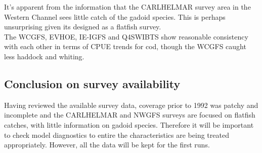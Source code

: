 \documentclass[12pt]{article}\usepackage[]{graphicx}\usepackage[]{color}
\makeatletter
\newcommand{\hlnum}[1]{\textcolor[rgb]{0.686,0.059,0.569}{#1}}%
\newcommand{\hlstr}[1]{\textcolor[rgb]{0.192,0.494,0.8}{#1}}%
\newcommand{\hlopt}[1]{\textcolor[rgb]{0,0,0}{#1}}%
\newcommand{\hlstd}[1]{\textcolor[rgb]{0.345,0.345,0.345}{#1}}%
\newcommand{\hlkwb}[1]{\textcolor[rgb]{0.69,0.353,0.396}{#1}}%
\newcommand{\hlkwc}[1]{\textcolor[rgb]{0.333,0.667,0.333}{#1}}%
\newcommand{\hlkwd}[1]{\textcolor[rgb]{0.737,0.353,0.396}{\textbf{#1}}}%
\newenvironment{kframe}{%
 \def\at@end@of@kframe{}%
 \ifinner\ifhmode%
  \def\at@end@of@kframe{\end{minipage}}%
  \begin{minipage}{\columnwidth}%
 \fi\fi%
 \def\FrameCommand##1{\hskip\@totalleftmargin \hskip-\fboxsep
 \colorbox{shadecolor}{##1}\hskip-\fboxsep
     \hskip-\linewidth \hskip-\@totalleftmargin \hskip\columnwidth}%
 \MakeFramed {\advance\hsize-\width
   \@totalleftmargin\z@ \linewidth\hsize
   \@setminipage}}%
 {\par\unskip\endMakeFramed%
 \at@end@of@kframe}
\newenvironment{knitrout}{}{} %
\makeatother
\begin{document}

It's apparent from the information that the CARLHELMAR survey area in the
Western Channel sees little catch of the gadoid species. This is perhaps
unsurprising given its designed as a flatfish survey. \\

The WCGFS, EVHOE, IE-IGFS and Q4SWIBTS show reasonable consistency with each
other in terms of CPUE trends for cod, though the WCGFS caught less haddock and
whiting. \\

\subsection{Conclusion on survey availability}

Having reviewed the available survey data, coverage prior to 1992 was patchy
and incomplete and the CARLHELMAR and NWGFS surveys are focused on flatfish
catches, with little information on gadoid species. Therefore it will be
important to check model diagnostics to entire the characteristics are being
treated appropriately. However, all the data will be kept for the first runs.\\
\end{document}

